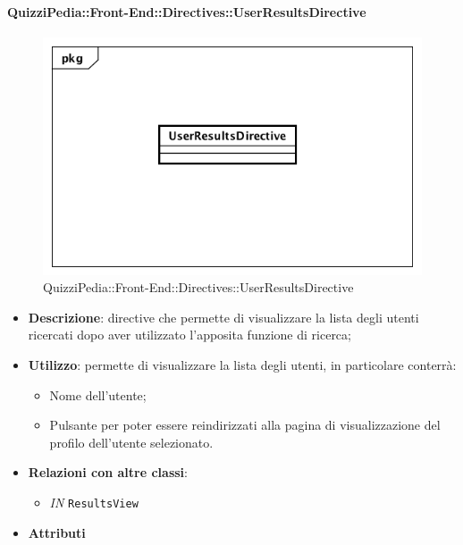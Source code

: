 \paragraph{QuizziPedia::Front-End::Directives::UserResultsDirective}

\label{QuizziPedia::Front-End::Directives::UserResultsDirective}

\begin{figure}[h]
	\centering
	\includegraphics[scale=0.5,keepaspectratio]{UML/Classi/Front-End/QuizziPedia_Front-end_Directives_UserResultsDirective.png}
	\caption{QuizziPedia::Front-End::Directives::UserResultsDirective}
\end{figure}

\begin{itemize}
	\item \textbf{Descrizione}: directive che permette di visualizzare la lista degli utenti ricercati dopo aver utilizzato l'apposita funzione di ricerca;
	\item \textbf{Utilizzo}: permette di visualizzare la lista degli utenti, in particolare conterrà:
	\begin{itemize}
		\item Nome dell'utente;
		\item Pulsante per poter essere reindirizzati alla pagina di visualizzazione del profilo dell'utente selezionato.
	\end{itemize}
	\item \textbf{Relazioni con altre classi}:
	\begin{itemize}
		\item \textit{IN} \texttt{ResultsView} 
	\end{itemize}
	\item \textbf{Attributi}
\end{itemize}
